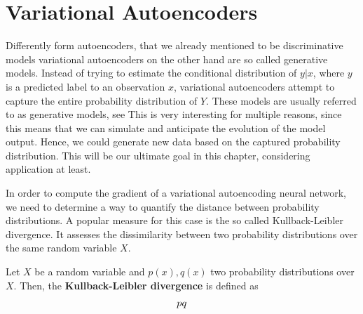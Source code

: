 \chapter{Variational Autoencoders}\label{vae}

Differently form autoencoders, that we already mentioned to be discriminative models variational autoencoders on the other hand are so called generative models. Instead of trying to estimate the conditional distribution of $y|x$, where $y$ is a predicted label to an observation $x$, variational autoencoders attempt to capture the entire probability distribution of $Y$. These models are usually referred to as generative models, see \cite[chapter~5]{cinelli2021variational} This is very interesting for multiple reasons, since this means that we can simulate and anticipate the evolution of the model output. Hence, we could generate new data based on the captured probability distribution. This will be our ultimate goal in this chapter, considering application at least.

In order to compute the gradient of a variational autoencoding neural network, we need to determine a way to quantify the distance between probability distributions. A popular measure for this case is the so called Kullback-Leibler divergence. It assesses the dissimilarity between two probability distributions over the same 	random variable $X$.
\begin{definition}\label{kl_div}
Let $X$ be a random variable and $p(x), q(x)$ two probability distributions over $X$. Then, the \textbf{Kullback-Leibler divergence} is defined as
\begin{align}
\KL{p}{q}
\end{align}
\end{definition}
